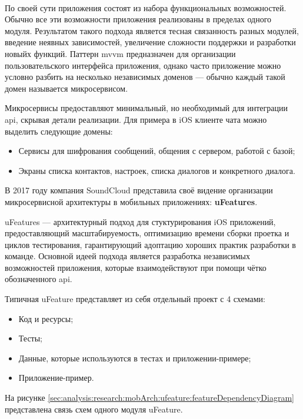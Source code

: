 \paragraph{}
По своей сути приложения состоят из набора функциональных возможностей. Обычно все эти возможности приложения реализованы в пределах одного модуля. Результатом такого подхода является тесная связанность разных модулей, введение неявных зависимостей, увеличение сложности поддержки и разработки новыйх функций. Паттерн \gls{mvvm} предназначен для организации пользовательского интерфейса приложения, однако часто приложение можно условно разбить на несколько независимых доменов --- обычно каждый такой домен называется микросервисом.

Микросервисы предоставляют минимальный, но необходимый для интеграции \gls{api}, скрывая детали реализации. Для примера в iOS клиенте чата можно выделить следующие домены:

\begin{itemize}
	\item Сервисы для шифрования сообщений, общения с сервером, работой с базой;
	\item Экраны списка контактов, настроек, списка диалогов и конкретного диалога.
\end{itemize}

В 2017 году компания SoundCloud представила своё видение организации микросервисной архитектуры в мобильных приложениях: \textbf{uFeatures}.

uFeatures --- архитектурный подход для стуктурирования iOS приложений, предоставляющий масштабируемость, оптимизацию времени сборки проетка и циклов тестирования, гарантирующий адоптацию хороших практик разработки в команде. Основной идеей подхода является разработка независимых возможностей приложения, которые взаимодействуют при помощи чётко обозначенного \gls{api}. \cite{soundcloud:ufeature}

Типичная uFeature представляет из себя отдельный проект с 4 схемами:

\begin{itemize}
	\item Код и ресурсы;
	\item Тесты;
	\item Данные, которые используются в тестах и приложении-примере;
	\item Приложение-пример.
\end{itemize}

На рисунке \ref{sec:analysis:research:mobArch:ufeature:featureDependencyDiagram} представлена связь схем одного модуля uFeature.

